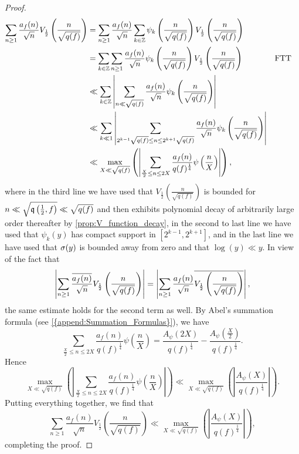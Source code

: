 \begin{proof}
\begin{align*}
        \sum_{n \ge 1}\frac{a_{f}(n)}{\sqrt{n}}V_{\frac{1}{2}}\left(\frac{n}{\sqrt{q(f)}}\right) &= \sum_{n \ge 1}\frac{a_{f}(n)}{\sqrt{n}}\sum_{k \in \mathbb{Z}}\psi_{k}\left(\frac{n}{\sqrt{q(f)}}\right)V_{\frac{1}{2}}\left(\frac{n}{\sqrt{q(f)}}\right) \\
        &= \sum_{k \in \mathbb{Z}}\sum_{n \ge 1}\frac{a_{f}(n)}{\sqrt{n}}\psi_{k}\left(\frac{n}{\sqrt{q(f)}}\right)V_{\frac{1}{2}}\left(\frac{n}{\sqrt{q(f)}}\right) && \text{FTT} \\
        &\ll \sum_{k \in \mathbb{Z}}\left|\sum_{n \ll \sqrt{q(f)}}\frac{a_{f}(n)}{\sqrt{n}}\psi_{k}\left(\frac{n}{\sqrt{q(f)}}\right)\right| \\
        &\ll \sum_{k \ll 1}\left|\sum_{2^{k-1}\sqrt{q(f)} \le n \le 2^{k+1}\sqrt{q(f)}}\frac{a_{f}(n)}{\sqrt{n}}\psi_{k}\left(\frac{n}{\sqrt{q(f)}}\right)\right| \\
        &\ll \max_{X \ll \sqrt{q(f)}}\left(\left|\sum_{\frac{X}{2} \le n \le 2X}\frac{a_{f}(n)}{q(f)^{\frac{1}{4}}}\psi\left(\frac{n}{X}\right)\right|\right),
      \end{align*}
      where in the third line we have used that $V_{\frac{1}{2}}\left(\frac{n}{\sqrt{q(f)}}\right)$ is bounded for $n \ll \sqrt{\mathfrak{q}\left(\frac{1}{2},f\right)} \ll \sqrt{q(f)}$ and then exhibits polynomial decay of arbitrarily large order thereafter by \cref{prop:V_function_decay}, in the second to last line we have used that $\psi_{k}(y)$ has compact support in $[2^{k-1},2^{k+1}]$, and in the last line we have used that $\sigma(y)$ is bounded away from zero and that $\log(y) \ll y$. In view of the fact that
      \[
        \left|\sum_{n \ge 1}\frac{\overline{a_{f}(n)}}{\sqrt{n}}V_{\frac{1}{2}}\left(\frac{n}{\sqrt{q(f)}}\right)\right| = \left|\sum_{n \ge 1}\frac{a_{f}(n)}{\sqrt{n}}\overline{V_{\frac{1}{2}}\left(\frac{n}{\sqrt{q(f)}}\right)}\right|,
      \]
      the same estimate holds for the second term as well. By Abel's summation formula (see \cref{{append:Summation_Formulas}}), we have
      \[
        \sum_{\frac{X}{2} \le n \le 2X}\frac{a_{f}(n)}{q(f)^{\frac{1}{4}}}\psi\left(\frac{n}{X}\right) = \frac{A_{\psi}(2X)}{q(f)^{\frac{1}{4}}}-\frac{A_{\psi}\left(\frac{X}{2}\right)}{q(f)^{\frac{1}{4}}}.
      \]
      Hence
      \[
        \max_{X \ll \sqrt{q(f)}}\left(\left|\sum_{\frac{X}{2} \le n \le 2X}\frac{a_{f}(n)}{q(f)^{\frac{1}{4}}}\psi\left(\frac{n}{X}\right)\right|\right) \ll \max_{X \ll \sqrt{q(f)}}\left(\left|\frac{A_{\psi}(X)}{q(f)^{\frac{1}{4}}}\right|\right).
      \]
      Putting everything together, we find that
      \[
        \sum_{n \ge 1}\frac{a_{f}(n)}{\sqrt{n}}V_{\frac{1}{2}}\left(\frac{n}{\sqrt{q(f)}}\right) \ll \max_{X \ll \sqrt{q(f)}}\left(\left|\frac{A_{\psi}(X)}{q(f)^{\frac{1}{4}}}\right|\right),
      \]
      completing the proof.
    \end{proof}
